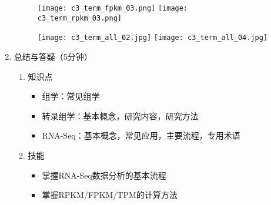 \documentclass{TIJMUjiaoanLL}
\begin{document}
\begin{enumerate}
\otherTail
\newpage
\otherHeader

        \vspace{-1em}
        \begin{figure}[h]
          \centering
          \texttt{[image: c3\_term\_fpkm\_03.png]}
          \texttt{[image: c3\_term\_rpkm\_03.png]}
        \end{figure}
        \vspace{-1em}
        \begin{figure}[h]
          \centering
          \texttt{[image: c3\_term\_all\_02.jpg]}
          \texttt{[image: c3\_term\_all\_04.jpg]}
        \end{figure}
        \vspace{-1em}

  \item 总结与答疑（5分钟）
    \begin{enumerate}
      \item 知识点
	\begin{itemize}
	  \item 组学：常见组学
	  \item 转录组学：基本概念，研究内容，研究方法
    \item RNA-Seq：基本概念，常见应用，主要流程，专用术语
	\end{itemize}
      \item 技能
	\begin{itemize}
    \item 掌握RNA-Seq数据分析的基本流程
    \item 掌握RPKM/FPKM/TPM的计算方法
	\end{itemize}
    \end{enumerate}
\end{enumerate}

\otherTail
\end{document}
